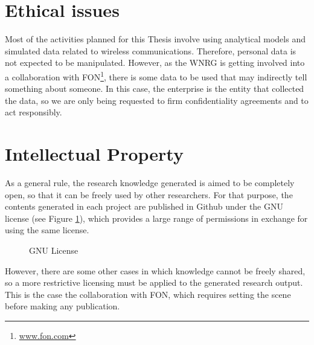 \documentclass[12pt, a4paper,twoside]{article}
\begin{document}
	\section{Ethical issues}
	\label{section:ethical}		
	Most of the activities planned for this Thesis involve using analytical models and simulated data related to wireless communications. Therefore, personal data is not expected to be manipulated. However, as the WNRG is getting involved into a collaboration with FON\footnote{\url{www.fon.com}}, there is some data to be used that may indirectly tell something about someone. In this case, the enterprise is the entity that collected the data, so we are only being requested to firm confidentiality agreements and to act responsibly.
		
	\section{Intellectual Property}
	\label{section:intellectual}		
	As a general rule, the research knowledge generated is aimed to be completely open, so that it can be freely used by other researchers. For that purpose, the contents generated in each project are published in Github under the GNU license (see Figure \ref{fig:gnu_license}), which provides a large range of permissions in exchange for using the same license. 
	\begin{figure}[t!]
		\centering
		\caption{GNU License}
		\label{fig:gnu_license}
	\end{figure}	
	However, there are some other cases in which knowledge cannot be freely shared, so a more restrictive licensing must be applied to the generated research output. This is the case the collaboration with FON, which requires setting the scene before making any publication.	

\end{document}
